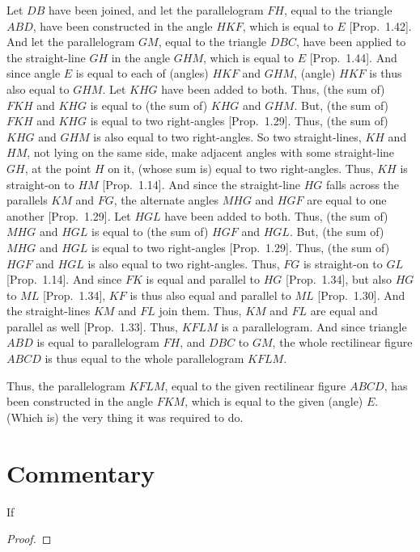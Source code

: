 Let $DB$ have been joined, and let the parallelogram $FH$, equal to
the triangle $ABD$, have been
constructed in the angle $HKF$, which is equal to $E$ [Prop.~1.42].
And let the parallelogram $GM$, equal to the triangle $DBC$, have been
applied to the straight-line $GH$ in the angle $GHM$,
which is equal to $E$ [Prop.~1.44]. And since angle $E$ is equal to each of
(angles) $HKF$ and $GHM$,  (angle) $HKF$ is thus also equal to $GHM$. 
Let $KHG$ have been added to both. Thus, (the sum of) $FKH$ and $KHG$ is
equal to (the sum of) $KHG$ and $GHM$. But, (the sum of) $FKH$ and $KHG$ is equal to
two right-angles [Prop.~1.29]. Thus, (the sum of) $KHG$ and $GHM$ is also equal to
two right-angles. So two straight-lines, $KH$ and $HM$, not lying on the same side, make  adjacent angles with some straight-line $GH$, 
at the point $H$ on it, (whose sum is) equal to two right-angles.
Thus, $KH$ is straight-on to $HM$ [Prop.~1.14].
And since the straight-line $HG$ falls across the parallels $KM$ and $FG$, the alternate angles
$MHG$ and $HGF$ are equal to one another [Prop.~1.29]. Let $HGL$ have
been added to both. Thus, (the sum of) $MHG$ and $HGL$ is equal to 
(the sum of) $HGF$ and $HGL$.
But, (the sum of) $MHG$ and $HGL$ is equal to two right-angles [Prop.~1.29].
Thus, (the sum of) $HGF$ and $HGL$ is also equal to two right-angles.
Thus, $FG$ is straight-on to $GL$ [Prop.~1.14]. And since $FK$ is
equal and parallel to $HG$ [Prop.~1.34], but also $HG$ to $ML$ [Prop.~1.34],
$KF$ is thus also equal and parallel to $ML$ [Prop.~1.30]. And the straight-lines $KM$ and
$FL$ join them. Thus, $KM$ and $FL$ are equal and parallel as well [Prop.~1.33].
Thus, $KFLM$ is a parallelogram. And since triangle $ABD$ is equal to parallelogram $FH$, and $DBC$ to $GM$, the whole rectilinear figure
$ABCD$ is thus equal to the whole parallelogram $KFLM$.

Thus, the parallelogram $KFLM$, equal to the given
rectilinear figure $ABCD$, has been constructed in the angle
$FKM$, which is equal to the given (angle) $E$. (Which is) the very thing it was
required to do.


\section*{Commentary}

\begin{proposition}\label{proposition_45}\leanok
    If
\end{proposition}
\begin{proof}
    \leanok
\end{proof}
